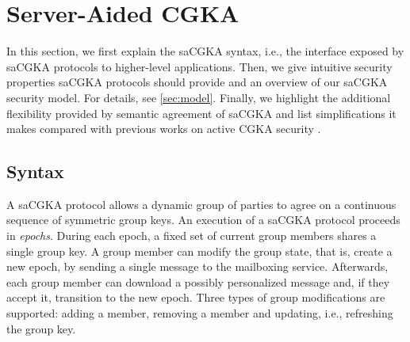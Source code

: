
\section{Server-Aided CGKA}\label{sec:cgka}
In this section, we first explain the saCGKA syntax, i.e., the interface exposed by saCGKA protocols to higher-level applications. Then, we give intuitive security properties saCGKA protocols should provide and an overview of our saCGKA security model. For details, see \cref{sec:model}. Finally, we highlight the additional flexibility provided by semantic agreement of saCGKA and list simplifications it makes compared with previous works on active CGKA security \cite{TCC:ACJM20,EPRINT:AlwJosMul20,hashimoto2021cmpke}.

\subsection{Syntax}
A saCGKA protocol allows a dynamic group of parties to agree on a continuous sequence of symmetric group keys. An execution of a saCGKA protocol proceeds in \emph{epochs}. During each epoch, a fixed set of current group members shares a single group key. A group member can modify the group state, that is, create a new epoch, by sending a single message to the mailboxing service. Afterwards, each group member can download a possibly personalized message and, if they accept it, transition to the new epoch. Three types of group modifications are supported: adding a member, removing a member and updating, i.e., refreshing the group key.


